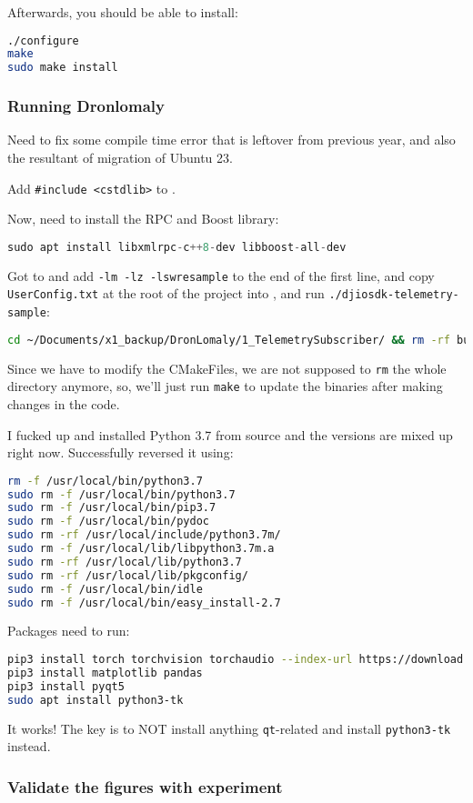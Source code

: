 Afterwards, you should be able to install:
\begin{lstlisting}[language=bash]
./configure
make
sudo make install
\end{lstlisting}

\subsubsection{Running Dronlomaly}

Need to fix some compile time error that is leftover from previous year, and also the resultant of migration of Ubuntu 23.

Add \texttt{\#include <cstdlib>} to .

Now, need to install the RPC and Boost library:
\begin{lstlisting}[language=C++]
sudo apt install libxmlrpc-c++8-dev libboost-all-dev
\end{lstlisting}

Got to  and add \texttt{-lm -lz -lswresample} to the end of the first line, and copy \texttt{UserConfig.txt} at the root of the project into , and run \texttt{./djiosdk-telemetry-sample}:
\begin{lstlisting}[language=bash]
cd ~/Documents/x1_backup/DronLomaly/1_TelemetrySubscriber/ && rm -rf build && mkdir build && cd build && cmake .. && make && cp ../../UserConfig.txt bin
\end{lstlisting}
Since we have to modify the CMakeFiles, we are not supposed to \texttt{rm} the whole directory anymore, so, we'll just run \texttt{make} to update the binaries after making changes in the code.

I fucked up and installed Python 3.7 from source and the versions are mixed up right now. Successfully reversed it using:
\begin{lstlisting}[language=bash]
rm -f /usr/local/bin/python3.7
sudo rm -f /usr/local/bin/python3.7
sudo rm -f /usr/local/bin/pip3.7
sudo rm -f /usr/local/bin/pydoc
sudo rm -rf /usr/local/include/python3.7m/
sudo rm -f /usr/local/lib/libpython3.7m.a 
sudo rm -rf /usr/local/lib/python3.7
sudo rm -rf /usr/local/lib/pkgconfig/
sudo rm -f /usr/local/bin/idle
sudo rm -f /usr/local/bin/easy_install-2.7
\end{lstlisting}

Packages need to run:
\begin{lstlisting}[language=bash]
pip3 install torch torchvision torchaudio --index-url https://download.pytorch.org/whl/cpu
pip3 install matplotlib pandas
pip3 install pyqt5
sudo apt install python3-tk
\end{lstlisting}
It works! The key is to NOT install anything \texttt{qt}-related and install \texttt{python3-tk} instead.


\subsubsection{Validate the figures with experiment}

